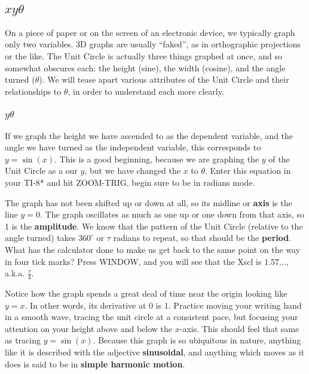 
\subsection{$xy\theta$}



On a piece of paper or on the screen of an electronic device, we typically graph only two
variables.  3D graphs are usually ``faked'', as in orthographic projections or the like.  The 
Unit Circle is actually three things graphed at once, and so somewhat obscures each:
the height (sine), the width (cosine), and the angle turned ($\theta$).  We will tease apart
various attributes of the Unit Circle and their relationships to $\theta$, in order to understand
each more clearly.

\subsubsection{$y\theta$}
If we graph the height we have ascended to as the dependent variable, and the angle we
have turned as the independent variable, this corresponds to $y=\sin(x)$.  This is a good
beginning, because we are graphing the $y$ of the Unit Circle as a our $y$, but we have
changed the $x$ to $\theta$.  Enter this equation in your TI-8* and hit ZOOM-TRIG, begin
sure to be in radians mode.

The graph has not been shifted up or down at all, so its midline or \textbf{axis} is the line
$y=0$.  The graph oscillates as much as one up or one down from that axis, so 1
is the \textbf{amplitude}.  We know that the pattern of the Unit Circle (relative to
the angle turned) takes $360^\circ$ or $\tau$ radians to repeat, so that should
be the \textbf{period}.  What has the calculator done to make us get back to the
same point on the way in four tick marks?  Press WINDOW, and you will see that
the Xscl is $1.57\dots$, a.k.a. $\frac{\tau}{4}$.

Notice how the graph spends a great deal of time near the origin looking like $y=x$.
In other words, its derivative at 0 is 1.  Practice moving your writing hand in a smooth
wave, tracing the unit circle at a consistent pace, but focusing your attention on your
height above and below the $x$-axis.  This should feel that same as tracing $y=\sin(x)$.
Because this graph is so ubiquitous in nature, anything like it is described with the
adjective \textbf{sinusoidal}, and anything which moves as it does is said to be in 
\textbf{simple harmonic motion}.

